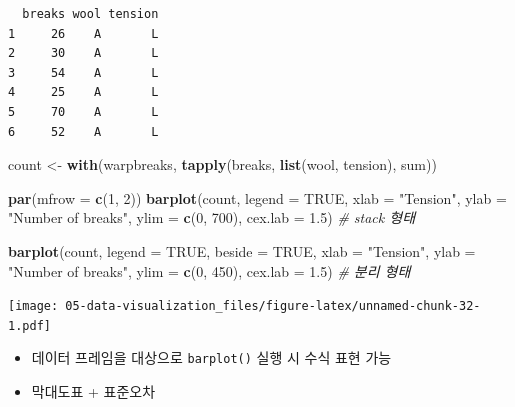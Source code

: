 \documentclass[
  11pt,
]{krantz}
\newenvironment{Shaded}{\begin{snugshade}}{\end{snugshade}}
\newcommand{\CommentTok}[1]{\textcolor[rgb]{0.37,0.37,0.37}{\textit{#1}}}
\newcommand{\DataTypeTok}[1]{\textcolor[rgb]{0.27,0.27,0.27}{#1}}
\newcommand{\DecValTok}[1]{\textcolor[rgb]{0.06,0.06,0.06}{#1}}
\newcommand{\FloatTok}[1]{\textcolor[rgb]{0.06,0.06,0.06}{#1}}
\newcommand{\KeywordTok}[1]{\textcolor[rgb]{0.27,0.27,0.27}{\textbf{#1}}}
\newcommand{\NormalTok}[1]{#1}
\newcommand{\OtherTok}[1]{\textcolor[rgb]{0.37,0.37,0.37}{#1}}
\newcommand{\StringTok}[1]{\textcolor[rgb]{0.5,0.5,0.5}{#1}}
\providecommand{\tightlist}{%
  \setlength{\itemsep}{0pt}\setlength{\parskip}{0pt}}
\begin{document}
\begin{verbatim}
  breaks wool tension
1     26    A       L
2     30    A       L
3     54    A       L
4     25    A       L
5     70    A       L
6     52    A       L
\end{verbatim}

\begin{Shaded}
\begin{Highlighting}[]
\NormalTok{count <-}\StringTok{ }\KeywordTok{with}\NormalTok{(warpbreaks, }
              \KeywordTok{tapply}\NormalTok{(breaks, }\KeywordTok{list}\NormalTok{(wool, tension), }
\NormalTok{                     sum))}

\KeywordTok{par}\NormalTok{(}\DataTypeTok{mfrow =} \KeywordTok{c}\NormalTok{(}\DecValTok{1}\NormalTok{, }\DecValTok{2}\NormalTok{))}
\KeywordTok{barplot}\NormalTok{(count, }\DataTypeTok{legend =} \OtherTok{TRUE}\NormalTok{, }
        \DataTypeTok{xlab =} \StringTok{"Tension"}\NormalTok{, }
        \DataTypeTok{ylab =} \StringTok{"Number of breaks"}\NormalTok{, }
        \DataTypeTok{ylim =} \KeywordTok{c}\NormalTok{(}\DecValTok{0}\NormalTok{, }\DecValTok{700}\NormalTok{), }
        \DataTypeTok{cex.lab =} \FloatTok{1.5}\NormalTok{) }\CommentTok{# stack 형태}

\KeywordTok{barplot}\NormalTok{(count, }\DataTypeTok{legend =} \OtherTok{TRUE}\NormalTok{, }\DataTypeTok{beside =} \OtherTok{TRUE}\NormalTok{, }
        \DataTypeTok{xlab =} \StringTok{"Tension"}\NormalTok{, }
        \DataTypeTok{ylab =} \StringTok{"Number of breaks"}\NormalTok{, }
        \DataTypeTok{ylim =} \KeywordTok{c}\NormalTok{(}\DecValTok{0}\NormalTok{, }\DecValTok{450}\NormalTok{), }
        \DataTypeTok{cex.lab =} \FloatTok{1.5}\NormalTok{) }\CommentTok{# 분리 형태}
\end{Highlighting}
\end{Shaded}

\texttt{[image: 05-data-visualization\_files/figure-latex/unnamed-chunk-32-1.pdf]}

\normalsize

\begin{itemize}
\tightlist
\item
  데이터 프레임을 대상으로 \texttt{barplot()} 실행 시 수식 표현 가능
\item
  막대도표 + 표준오차
\end{itemize}

\footnotesize
\end{document}
